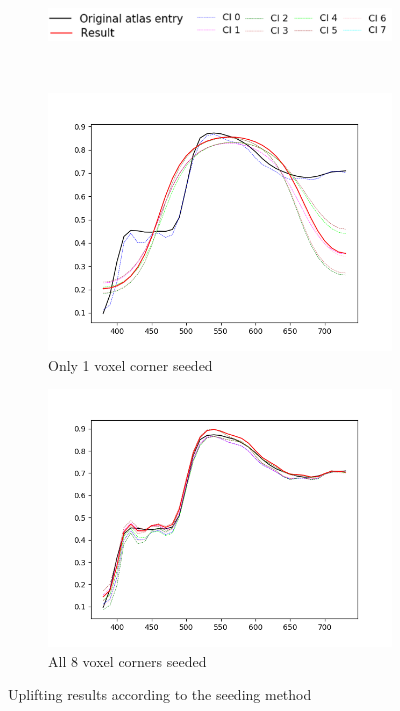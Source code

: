 \begin{figure}[t]
	\centering
	\begin{subfigure}[t]{0.54\textwidth}
		\includegraphics[width=\linewidth]{img/seeding_method_legend.png}
	\end{subfigure} \\
	\begin{subfigure}[t]{0.45\textwidth}
		\includegraphics[width=\linewidth,height=0.2\textheight]{img/seeding_method_1corner.png}
		\caption{Only 1 voxel corner seeded}
		\label{fig:seedingMethod1corner}
	\end{subfigure} \hspace{0.1em}
	\begin{subfigure}[t]{0.45\textwidth}
		\includegraphics[width=\linewidth]{img/seeding_method_8corners.png}
		\caption{All 8 voxel corners seeded}
		\label{fig:seedingMethod8corners}
	\end{subfigure}
	\caption{Uplifting results according to the seeding method}
	\label{fig:seedingMethodInterpolation}
\end{figure}

